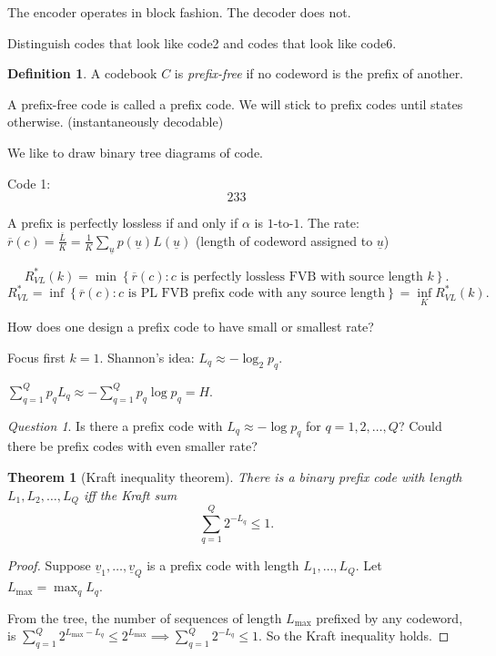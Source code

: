 \documentclass{report}
\newcommand{\set}[1]{\left\lbrace #1 \right\rbrace}
\newtheorem{theorem}{Theorem}[section]
\theoremstyle{definition}
\newtheorem{definition}{Definition}[section]
\theoremstyle{remark}
\newtheorem*{question}{Question}
\numberwithin{equation}{section}
\begin{document}
The encoder operates in block fashion. The decoder does not.

Distinguish codes that look like code2 and codes that look like code6.

\begin{definition}
  A codebook $C$ is \emph{prefix-free} if no codeword is the prefix of another. 
\end{definition}
A prefix-free code is called a prefix code. We will stick to prefix codes until states otherwise.
(instantaneously decodable)

We like to draw binary tree diagrams of code.

Code 1: \[
  233
\]

A prefix is perfectly lossless if and only if $\alpha$ is $1$-to-$1$.
The rate: $\overline{r}(c) = \frac{\overline{L}}{K} = \frac{1}{K}\sum_{\underline{u}}p(\underline{u})L(\underline{u})$ (length of codeword assigned to $\underline{u}$)

\[
  R^*_{VL}(k) = \min \set{\overline{r}(c): c \text{ is perfectly lossless FVB with source length $k$}}.
\]
\[
  R^*_{VL} = \inf \set{\overline{r}(c): c \text{ is PL FVB prefix code with any source length}} = \inf_K R^*_{VL}(k).
\]

How does one design a prefix code to have small or smallest rate?

Focus first $k = 1$. Shannon's idea: $L_q \approx -\log_2 p_q$.

$\sum_{q=1}^Q p_q L_q \approx -\sum_{q=1}^Q p_q \log p_q = H$.

\begin{question}
  Is there a prefix code with $L_q \approx -\log p_q$ for $q = 1, 2, \ldots, Q$? Could there be prefix codes with even smaller rate?
\end{question}

\begin{theorem}[Kraft inequality theorem]
  There is a binary prefix code with length $L_1, L_2, \ldots, L_Q$ iff the Kraft sum \[\sum_{q=1}^Q 2^{-L_q} \leq 1.\]
\end{theorem}
\begin{proof}
  Suppose $\underline{v}_1, \ldots, \underline{v}_Q$ is a prefix code with length $L_1, \ldots, L_Q$. Let $L_{\max} = \max_q L_q$.

  From the tree, the number of sequences of length $L_{\max}$ prefixed by any codeword, is $\sum_{q=1}^Q 2^{L_{\max} - L_q} \leq 2^{L_{\max}} \implies \sum_{q=1}^Q 2^{-L_q} \leq 1$. So the Kraft inequality holds.
\end{proof}
\end{document}

